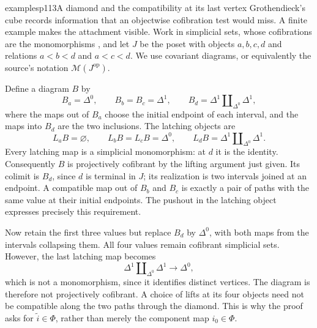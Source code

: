 \begin{dcomment}{examples}{p113}{A diamond and the compatibility at its last vertex}
Grothendieck's cube records information that an objectwise cofibration test would miss. A finite example makes the attachment visible. Work in simplicial sets, whose cofibrations are the monomorphisms \citep[Example~11.3.5]{Riehl2014}, and let $J$ be the poset with objects $a,b,c,d$ and relations $a<b<d$ and $a<c<d$. We use covariant diagrams, or equivalently the source's notation $\mathcal M(J^{\mathrm{op}})$.

Define a diagram $B$ by
\[
 B_a=\Delta^0,\qquad
 B_b=B_c=\Delta^1,\qquad
 B_d=\Delta^1\amalg_{\Delta^0}\Delta^1,
\]
where the maps out of $B_a$ choose the initial endpoint of each interval, and the maps into $B_d$ are the two inclusions. The latching objects are
\[
 L_aB=\varnothing,\qquad
 L_bB=L_cB=\Delta^0,\qquad
 L_dB=\Delta^1\amalg_{\Delta^0}\Delta^1.
\]
Every latching map is a simplicial monomorphism: at $d$ it is the identity. Consequently $B$ is projectively cofibrant by the lifting argument just given. Its colimit is $B_d$, since $d$ is terminal in $J$; its realization is two intervals joined at an endpoint. A compatible map out of $B_b$ and $B_c$ is exactly a pair of paths with the same value at their initial endpoints. The pushout in the latching object expresses precisely this requirement.

Now retain the first three values but replace $B_d$ by $\Delta^0$, with both maps from the intervals collapsing them. All four values remain cofibrant simplicial sets. However, the last latching map becomes
\[
 \Delta^1\amalg_{\Delta^0}\Delta^1\longrightarrow\Delta^0,
\]
which is not a monomorphism, since it identifies distinct vertices. The diagram is therefore not projectively cofibrant. A choice of lifts at its four objects need not be compatible along the two paths through the diamond. This is why the proof asks for $\widetilde i\in\Phi$, rather than merely the component map $i_0\in\Phi$.
\end{dcomment}

